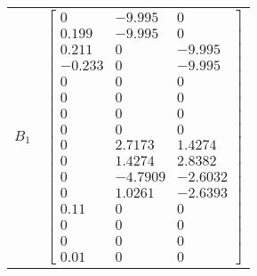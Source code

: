 \begin{tabular}{cl}
 $B_{1}$  & $\left[\begin{matrix}0 & -9.995 & 0\\0.199 & -9.995 & 0\\0.211 & 0 & -9.995\\-0.233 & 0 & -9.995\\0 & 0 & 0\\0 & 0 & 0\\0 & 0 & 0\\0 & 0 & 0\\0 & 2.7173 & 1.4274\\0 & 1.4274 & 2.8382\\0 & -4.7909 & -2.6032\\0 & 1.0261 & -2.6393\\0.11 & 0 & 0\\0 & 0 & 0\\0 & 0 & 0\\0.01 & 0 & 0\end{matrix}\right]$                                                                                                                                                                                                                                                                                                                                                                                                                                                                                                                                                                                                                                                                                                                                                                                                                                                                                                                                                                                                   \\

\end{tabular}

